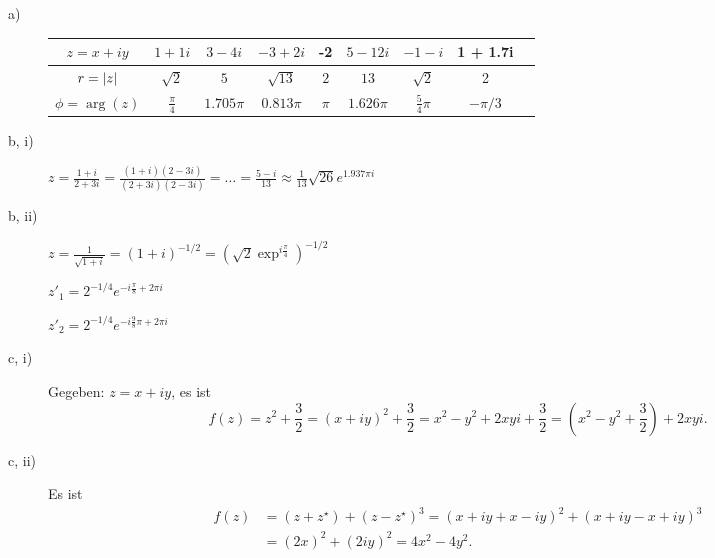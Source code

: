 \begin{description}
	\item[a)] 
	\begin{tabular}{|c||c|c|c|c|c|c|c|c|}
		\hline 
		$z = x + iy$ & $1 + 1i$ & $3 - 4i$ & $-3 + 2i$ & -2 & $5 - 12 i$ & $-1 - i$ & 1 + 1.7i \\
		\hline
		$r = \left\lvert z \right\rvert$ & $\sqrt{2}$ & $5$ & $\sqrt{13}$ & $2$ & $13$ & $\sqrt{2}$ & 2 \\
		\hline 
		$\phi = \arg(z)$ & $\frac{\pi}{4}$ & $1.705 \pi$ & $0.813 \pi$ & $\pi$ & $1.626 \pi$ & $\frac{5}{4} \pi$ & $-\pi/3$ \\
		\hline 
	\end{tabular}
 
	\item[b, i)] $z = \frac{1 + i}{2 + 3i} = \frac{(1 + i)(2 - 3i)}{(2 + 3i)(2 - 3i)} = \dots = \frac{5 - i}{13} \approx \frac{1}{13} \sqrt{26} e^{1.937 \pi i}$
	
	\item[b, ii)] $z = \frac{1}{\sqrt{1 + i}} = (1 + i)^{-1/2} = \left( \sqrt{2}\exp^{i \frac{\pi}{4}} \right)^{-1/2}$
	
		$z'_1 = 2^{-1/4} e^{-i \frac{\pi}{8} + 2 \pi i}$
		
		$z'_2 = 2^{-1/4} e^{-i \frac{9}{8} \pi + 2 \pi i}$

	\item[c, i)] Gegeben: $z = x + i y$, es ist 
	\[
		f(z) = z^2 + \frac{3}{2} = (x + iy)^2 + \frac{3}{2} = x^2 - y^2 + 2xyi + \frac{3}{2} = \left( x^2 - y^2 + \frac{3}{2} \right) + 2xyi
		\text{.}
	\]
	
	\item[c, ii)] Es ist
	\begin{align*}
		f(z) &= (z + z^\star) + (z - z^\star)^3 = (x + iy + x - iy)^2 + (x + iy - x + iy)^3 \\
		&= (2x)^2 + (2iy)^2 = 4x^2 - 4y^2
		\text{.}
	\end{align*}
\end{description}

